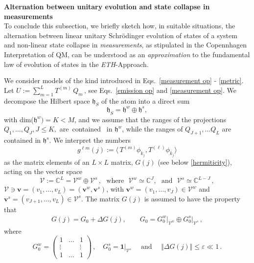 \documentclass[12pt]{article}
\begin{document}
{{\bf{Alternation between unitary evolution and state collapse in measurements}}\\

To conclude this subsection, we briefly sketch how, in suitable situations, the alternation between linear unitary 
Schr\"odinger evolution of states of a system and non-linear state collapse
 in \textit{measurements}, as stipulated in the Copennhagen Interpretation of QM, can be understood as 
 an \textit{approximation} to the fundamental law of evolution of states in the \textit{ETH}-Approach.

We consider models of the kind introduced in Eqs.~\eqref{measurement op} - \eqref{metric}. 
 Let $U:= \sum_{m=1}^{L} T^{(m)}\,Q_{m}$\,, see  Eqs.~\eqref{emission op} and \eqref{measurement op}.
We decompose the Hilbert space $\mathfrak{h}_S$ of the atom into a direct sum
\begin{equation}\label{dec}
\mathfrak{h}_S = \mathfrak{h}^{w} \oplus \mathfrak{h}^{s}, 
\end{equation}
with dim($\mathfrak{h}^{w}) = K < M$, and we assume that the ranges of the projections $Q_1, \dots, Q_J, J\leq K,$ 
\mbox{are contained } in $\mathfrak{h}^{w}$, while the ranges of $Q_{J+1}, \dots Q_L$ are contained in $\mathfrak{h}^{s}$. 
We interpret the numbers
$$g^{\ell m}(j):=  \langle \,T^{(m)}\phi_{k_j}, T^{(\ell)} \phi_{k_j}\rangle$$
as the matrix elements of an $L\times L$ matrix, $G(j)$ (see below \eqref{hermiticity}), acting on the vector space 
$$\mathcal{V}:=\mathbb{C}^{L}= \mathcal{V}^{w} \oplus \mathcal{V}^{s}\,,\,\, \text{ where }\,\, \mathcal{V}^{w}\simeq 
\mathbb{C}^{J},\,\, \text{ and }\,\, \mathcal{V}^{s}\simeq \mathbb{C}^{L-J}\,,$$
$\mathcal{V} \ni \mathbf{v}=(v_1,\dots, v_L) = (\mathbf{v}^{w}, \mathbf{v}^{s})$, with 
$\mathbf{v}^{w}=(v_1, \dots, v_J)\in \mathcal{V}^{w}$ and $\mathbf{v}^{s}=(v_{J+1}, \dots, v_{L})\in \mathcal{V}^{s}$.
The matrix $G(j)$ is assumed to have the property that
\begin{align}\label{metric ex}
G(j) = G_{0} + \Delta G(j), \qquad G_{0}= G_{0}^{w}\vert_{\mathcal{V}^{w}} \oplus G_{0}^{s}\vert_{\mathcal{V}^{s}}\,,
\end{align}
where
\begin{equation}\label{matrices}
G_{0}^{w} = \begin{pmatrix} 1& \hdots & 1\\ \vdots & & \vdots \\ 1& \hdots &1 \end{pmatrix}\,, \quad
G_{0}^{s} = \mathbf{1}\vert_{\mathcal{V}^{s}}\quad \text{  and  }\quad \Vert \Delta G(j) \Vert \leq \varepsilon \ll 1\,.

\end{equation}}
\end{document}
